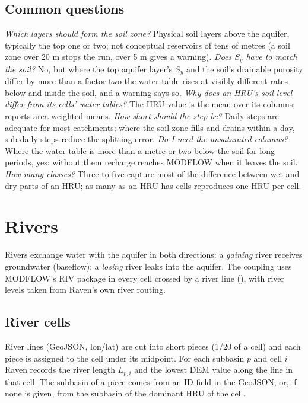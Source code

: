 \subsection{Common questions}
\textit{Which layers should form the soil zone?} Physical soil layers above the aquifer, typically the top one or two;
not conceptual reservoirs of tens of metres (a soil zone over 20 m stops the run, over 5 m gives a warning).
\textit{Does $S_y$ have to match the soil?} No, but where the top aquifer layer's $S_y$ and the soil's drainable porosity
differ by more than a factor two the water table rises at visibly different rates below and inside the soil, and a
warning says so. \textit{Why does an HRU's soil level differ from its cells' water tables?} The HRU value is the mean
over its columns;  reports area-weighted means. \textit{How short should the step be?} Daily
steps are adequate for most catchments; where the soil zone fills and drains within a day, sub-daily steps reduce the
splitting error. \textit{Do I need the unsaturated columns?} Where the water table is more than a metre or two below
the soil for long periods, yes: without them recharge reaches MODFLOW when it leaves the soil. \textit{How many
classes?} Three to five capture most of the difference between wet and dry parts of an HRU; as many as an HRU has
cells reproduces one HRU per cell.

\section{Rivers}\label{ch:rivers}
Rivers exchange water with the aquifer in both directions: a \emph{gaining} river receives groundwater (baseflow); a
\emph{losing} river leaks into the aquifer. The coupling uses MODFLOW's RIV package in every cell crossed by a river line
(), with river levels taken from Raven's own river routing.

\subsection{River cells}
River lines (GeoJSON, lon/lat) are cut into short pieces (1/20 of a cell) and each piece is assigned to the cell under its
midpoint. For each subbasin $p$ and cell $i$ Raven records the river length $L_{p,i}$ and the lowest DEM value along the
line in that cell. The subbasin of a piece comes from an ID field in the GeoJSON, or, if none is given, from the subbasin
of the dominant HRU of the cell.

